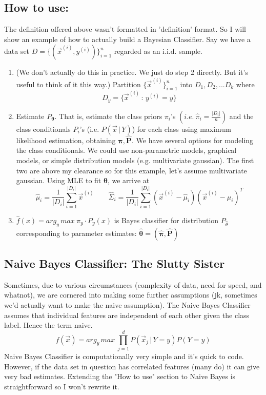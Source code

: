 \documentclass[10pt]{article}
\begin{document}
	\subsection*{How to use:}
		The definition offered above wasn't formatted in 'definition' format. So I will show an example of how 
		to actually build a Bayesian Classifier. Say we have
		a data set $D = \{ (\vec x^{(i)}, y^{(i)})\}_{i=1}^n$ regarded as an i.i.d. sample.
		\begin{enumerate}
			\item (We don't actually do this in practice. We just do step 2 directly. But it's useful to think of it this way.) 
				Partition $\{\vec x^{(i)}\}_{i=1}^{n}$ into $D_1, D_2, ... D_k$ where
				$$ D_y = \{\vec x^{(i)} \, : \, y^{(i)} = y\}$$
			\item Estimate $P_{\pmb \theta}$. That is, estimate the class priors $\pi_i$'s 
				$ (i.e. \ \hat \pi_i = \frac{|D_i|}{n})$ and the class conditionals
				$P_i$'s (i.e. $P(\vec x \, | \, Y)$) for each class using maximum likelihood estimation,
				obtaining $\hat{\pmb{\pi}}, \hat{\pmb{P}}$. We have several options for modeling the class conditionals. 
				We could use non-parametric models, graphical models, or simple distribution models (e.g. multivariate
				gaussian). The first two are above my clearance so for this example, let's assume multivariate gaussian. 
				Using MLE to fit $\pmb \theta$, we arrive at 
				$$ \hat{\mu}_i = \frac{1}{|D_i|}\sum_{i=1}^{|D_i|} \vec x^{(i)} \quad \quad
				\hat{\Sigma}_i = \frac{1}{|D_i|}\sum_{i=1}^{|D_i|} (\vec x^{(i)} - \hat \mu_i)(\vec x^{(i)} - \hat \mu_i)^T $$
			\item  $ \hat{f}(x) = arg_y \, max \ \pi_y \cdot P_y(x)$ is Bayes classifier for distribution $P_{\hat \theta}$ 
				corresponding to parameter estimates: $ \hat{\pmb{\theta}} = (\hat{\pmb{\pi}}, \hat{\pmb{P}}) $
		\end{enumerate}	
		
	\subsection*{Naive Bayes Classifier: The Slutty Sister}
		Sometimes, due to various circumstances (complexity of data, need for speed, and whatnot), we are 
		cornered into making some further assumptions (jk, sometimes we'd actually want to make the naive
		assumption). The Naive Bayes Classifier assumes that individual features 
		are independent of each other given the class label. Hence the term naive. 
		$$ f(\vec x) =  arg_y \, max \ \prod_{j=1}^{d}P(\vec x_j \, | \, Y=y)P(Y = y)$$
		Naive Bayes Classifier is computationally very simple and it's quick to code. However, if the data
		set in question has correlated features (many do) it can give very bad estimates. Extending the
		"How to use" section to Naive Bayes is straightforward so I won't rewrite it. \\
\end{document}
